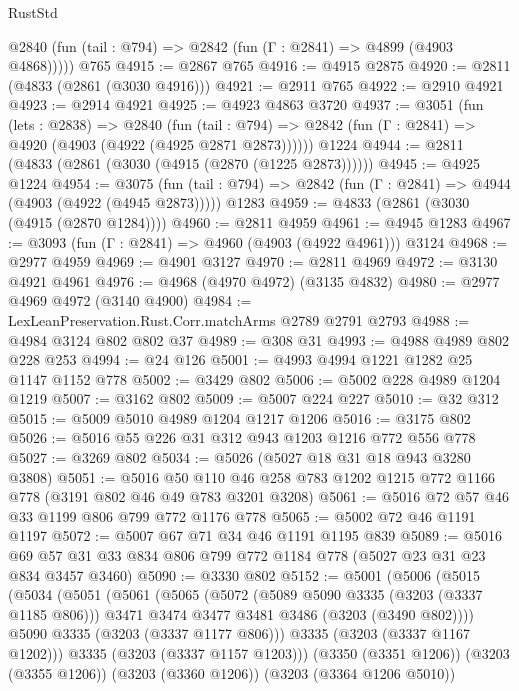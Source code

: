 \begin{lexlean}{RustStd}
\begin{coremodule}
{\begin{coremodule}
{{{{{{{{{{{{{{{      @2840 (fun (tail : @794) => @2842 (fun (Γ : @2841) => @4899 (@4903 @4868)))))
    @765
@4915 := @2867 @765
@4916 := @4915 @2875
@4920 := @2811 (@4833 (@2861 (@3030 @4916)))
@4921 := @2911 @765
@4922 := @2910 @4921
@4923 := @2914 @4921
@4925 := @4923 @4863 @3720
@4937 := @3051
    (fun (lets : @2838) =>
    @2840
      (fun (tail : @794) => @2842 (fun (Γ : @2841) => @4920 (@4903 (@4922 (@4925 @2871 @2873))))))
    @1224
@4944 := @2811 (@4833 (@2861 (@3030 (@4915 (@2870 (@1225 @2873))))))
@4945 := @4925 @1224
@4954 := @3075
    (fun (tail : @794) => @2842 (fun (Γ : @2841) => @4944 (@4903 (@4922 (@4945 @2873)))))
    @1283
@4959 := @4833 (@2861 (@3030 (@4915 (@2870 @1284))))
@4960 := @2811 @4959
@4961 := @4945 @1283
@4967 := @3093 (fun (Γ : @2841) => @4960 (@4903 (@4922 @4961))) @3124
@4968 := @2977 @4959
@4969 := @4901 @3127
@4970 := @2811 @4969
@4972 := @3130 @4921 @4961
@4976 := @4968 (@4970 @4972) (@3135 @4832)
@4980 := @2977 @4969 @4972 (@3140 @4900)
@4984 := LexLeanPreservation.Rust.Corr.matchArms @2789 @2791 @2793
@4988 := @4984 @3124 @802 @802 @37
@4989 := @308 @31
@4993 := @4988 @4989 @802 @228 @253
@4994 := @24 @126
@5001 := @4993 @4994 @1221 @1282 @25 @1147 @1152 @778
@5002 := @3429 @802
@5006 := @5002 @228 @4989 @1204 @1219
@5007 := @3162 @802
@5009 := @5007 @224 @227
@5010 := @32 @312
@5015 := @5009 @5010 @4989 @1204 @1217 @1206
@5016 := @3175 @802
@5026 := @5016 @55 @226 @31 @312 @943 @1203 @1216 @772 @556 @778
@5027 := @3269 @802
@5034 := @5026 (@5027 @18 @31 @18 @943 @3280 @3808)
@5051 := @5016
    @50
    @110
    @46
    @258
    @783
    @1202
    @1215
    @772
    @1166
    @778
    (@3191 @802 @46 @49 @783 @3201 @3208)
@5061 := @5016 @72 @57 @46 @33 @1199 @806 @799 @772 @1176 @778
@5065 := @5002 @72 @46 @1191 @1197
@5072 := @5007 @67 @71 @34 @46 @1191 @1195 @839
@5089 := @5016 @69 @57 @31 @33 @834 @806 @799 @772 @1184 @778 (@5027 @23 @31 @23 @834 @3457 @3460)
@5090 := @3330 @802
@5152 := @5001
    (@5006
      (@5015
        (@5034
          (@5051
            (@5061
              (@5065
                (@5072
                  (@5089 @5090 @3335 (@3203 (@3337 @1185 @806)))
                  @3471
                  @3474
                  @3477
                  @3481
                  @3486
                  (@3203 (@3490 @802))))
              @5090
              @3335
              (@3203 (@3337 @1177 @806)))
            @3335
            (@3203 (@3337 @1167 @1202)))
          @3335
          (@3203 (@3337 @1157 @1203)))
        (@3350 (@3351 @1206))
        (@3203 (@3355 @1206))
        (@3203 (@3360 @1206))
        (@3203 (@3364 @1206 @5010))
}}}}}}}}}}}}}}}
\end{coremodule}}
\end{coremodule}
\end{lexlean}
